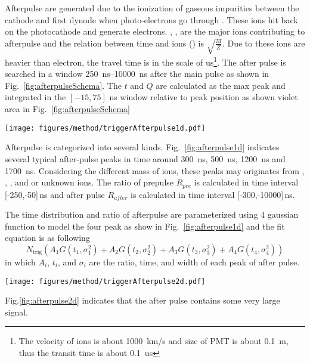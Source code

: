 Afterpulse are generated due to the ionization of gaseous impurities between the cathode and first dynode when photo-electrons go through \cite{Coates_1973}. These ions hit back on the photocathode and generate electrons. , ,  are the major ions contributing to afterpulse and the relation between time and ions () is $\sqrt{\frac{M}{Z}}$\cite{Coates_1973}. Due to these ions are heavier than electron, the travel time is in the scale of \si{us}\footnote{The velocity of ions is about \SI{1000}{km/s} and size of PMT is about \SI{0.1}{m}, thus the transit time is about \SI{0.1}{us}}. The after pulse is searched in a window \SIrange{250}{10000}{ns} after the main pulse as shown in Fig.~\ref{fig:afterpulseSchema}. The $t$ and $Q$ are calculated as the max peak and integrated in the $[-15,75]$ ns window relative to peak position as shown violet area in Fig.~\ref{fig:afterpulseSchema}
\begin{figure*}[!htbp]
    \centering
    \texttt{[image: figures/method/triggerAfterpulse1d.pdf]}
    \caption{Time distribution of after pulse. The orange and blue histogram are pre-pulse and after-pulse. The green line is the fit result for after pulse. The blank area around the \SI{0}{ns} is the main pulse which is not shown in this figure.}
    \label{fig:afterpulse1d}
\end{figure*}

Afterpulse is categorized into several kinds. Fig.~\ref{fig:afterpulse1d} indicates several typical after-pulse peaks in time around \SI{300}{ns}, \SI{500}{ns}, \SI{1200}{ns} and \SI{1700}{ns}. Considering the different mass of ions, these peaks may originates from , , , and  or unknown ions.
The ratio of prepulse $R_{pre}$ is calculated in time interval [-250,-50]\,ns and after pulse $R_{after}$ is calculated in time interval [-300,-10000]\,ns. 

The time distribution and ratio of afterpulse are parameterized using 4 gaussian function to model the four peak as show in Fig.~\ref{fig:afterpulse1d} and the fit equation is as following
\begin{equation}
    N_{\mathrm{trig}}(A_1G(t_1,\sigma_1^2)+A_2G(t_2,\sigma_2^2)+A_3G(t_3,\sigma_3^2)+A_4G(t_4,\sigma_4^2))
\end{equation}
in which $A_i$, $t_i$, and $\sigma_i$ are the ratio, time, and width of each peak of after pulse.
\begin{figure*}[!htbp]
    \centering
    \texttt{[image: figures/method/triggerAfterpulse2d.pdf]}
    \caption{time and charge distribution of after pulse}
    \label{fig:afterpulse2d}
\end{figure*}
Fig.\ref*{fig:afterpulse2d} indicates that the after pulse contains some very large signal.
